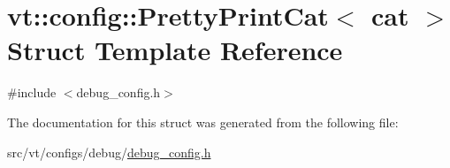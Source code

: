 \hypertarget{structvt_1_1config_1_1_pretty_print_cat}{}\section{vt\+:\+:config\+:\+:Pretty\+Print\+Cat$<$ cat $>$ Struct Template Reference}
\label{structvt_1_1config_1_1_pretty_print_cat}


{\ttfamily \#include $<$debug\+\_\+config.\+h$>$}



The documentation for this struct was generated from the following file\+:\begin{DoxyCompactItemize}
\item 
src/vt/configs/debug/\hyperlink{debug__config_8h}{debug\+\_\+config.\+h}\end{DoxyCompactItemize}
